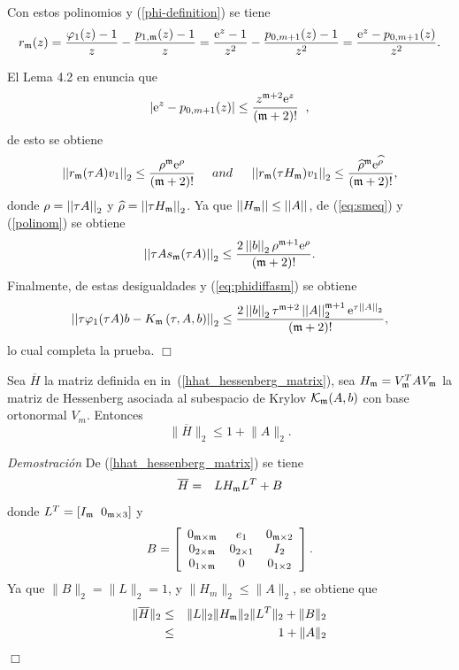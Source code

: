 Con estos polinomios y (\ref{phi-definition}) se tiene
\begin{equation*}
r_{\mathfrak{m}}(z) = \frac{\varphi_1(z)-1}{z}-\frac{p_{1,\mathfrak{m}}(z)-1}{z}=\frac{\mathrm{e}^{z}-1}{z^2}-\frac{p_{0,m+1}(z)-1}{z^2}
=\frac{\mathrm{e}^{z}-p_{0,m+1}(z)}{z^2}.
\end{equation*}

El Lema 4.2 en \cite{Saad92} enuncia que
\[ \left\lvert \mathrm{e}^{z}-p_{0,m+1}(z) \right\rvert \leq \frac{z^{\mathfrak{m}+2}\mathrm{e}^{z}}{(\mathfrak{m}+2)!}\;\;, \]
de esto se obtiene
\begin{equation}
\left\lvert \left\lvert r_{\mathfrak{m}}(\tau A)v_1 \right\rvert \right\rvert_2\leq \frac{\rho^{\mathfrak{m}}\mathrm{e}^{\rho}}{(\mathfrak{m}+2)!}\;\;\;\;\; and \;\;\;\;\; \left\lvert \left\lvert r_{\mathfrak{m}}(\tau H_{\mathfrak{m}})v_1 \right\rvert \right\rvert_2\leq \frac{\widehat{\rho}^{\mathfrak{m}}\mathrm{e}^{\widehat{\rho}}}{(\mathfrak{m}+2)!}, \label{polinom}
\end{equation}
donde $\rho=\left\lvert \left\lvert \tau A \right\rvert \right\rvert_2 $ y  $\widehat{\rho}=\left\lvert \left\lvert \tau H_{\mathfrak{m}} \right\rvert \right\rvert_2$. Ya que $\left\lvert \left\lvert H_{\mathfrak{m}} \right\rvert \right\rvert\leq\left\lvert \left\lvert A \right\rvert \right\rvert$, de (\ref{eq:smeq}) y (\ref{polinom}) se obtiene
\begin{equation*}
\left\lvert \left\lvert \tau As_{\mathfrak{m}}(\tau A) \right\rvert \right\rvert_2  \leq \frac{2 \left\lvert \left\lvert b \right\rvert \right\rvert_2\rho^{\mathfrak{m}+1}\mathrm{e}^{\rho}}{(\mathfrak{m}+2)!}.
\end{equation*}
Finalmente, de estas desigualdades y (\ref{eq:phidiffasm}) se obtiene
\begin{equation*}
\left\lvert \left\lvert \tau\varphi_1(\tau A)b - K_{\mathfrak{m}}\left(\tau,A , b \right) \right\rvert \right\rvert_2  \leq
\frac{2 \left\lvert \left\lvert b \right\rvert \right\rvert_2\tau^{\mathfrak{m}+2}\left\lvert \left\lvert A \right\rvert \right\rvert_2^{\mathfrak{m}+1}\mathrm{e}^{\tau \left\lvert \left\lvert A \right\rvert \right\rvert_2}}{(\mathfrak{m}+2)!},
\end{equation*}
lo cual completa la prueba. $\Box$

\begin{lemma}\cite{naranjo2021locally}\label{H-bound}
	Sea $\overline{H}$ la matriz definida en in~(\ref{hhat_hessenberg_matrix}), sea  $H_{\mathfrak{m}}=V^{T}_{\mathfrak{m}} AV_{\mathfrak{m}}$ la matriz de Hessenberg asociada al subespacio de Krylov $\mathcal{K}_{\mathfrak{m}}(A,b)$ con base ortonormal $V_m$. Entonces
	\[ \lVert\overline{H}\rVert_2 \leq 1 +  \lVert A\rVert_2. \]
\end{lemma}
\emph{Demostración}
De (\ref{hhat_hessenberg_matrix}) se tiene
\begin{eqnarray*}
	\overline{H}&=&L H_{\mathfrak{m}} L^T + B
\end{eqnarray*}
donde $ L^T=[I_{\mathfrak{m}} \;\; 0_{\mathfrak{m}\times 3}] $ y
\[B=\left[\begin{array}{ccc}
0_{\mathfrak{m}\times\mathfrak{m}} & e_1 & 0_{\mathfrak{m} \times 2}\\
0_{2\times\mathfrak{m}} & 0_{2 \times 1} & I_2\\
0_{1\times\mathfrak{m}} & 0 & 0_{1\times 2}
\end{array}\right].\]
Ya que $\lVert B\rVert_2 = \lVert L \rVert_2 = 1$, y $\lVert H_m\rVert_2 \le \lVert A \rVert_2$, se obtiene que
\begin{eqnarray*}
	\lVert\overline{H}\rVert_2 &\leq& \lVert L \rVert_2 \lVert H_{\mathfrak{m}} \rVert_2 \lVert L^T \rVert_2 + \lVert B \rVert_2\\
	&\leq& 1 + \lVert A\rVert_2
\end{eqnarray*}
$\Box$\\ \\


